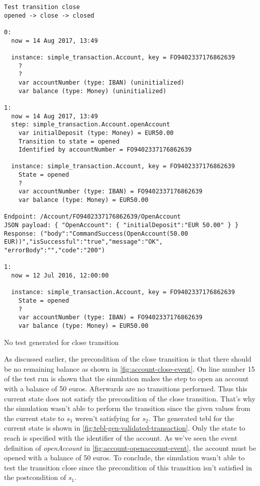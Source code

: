 \begin{sourcecode}[h!]
\begin{lstlisting}[]
Test transition close
opened -> close -> closed

0:
  now = 14 Aug 2017, 13:49

  instance: simple_transaction.Account, key = FO9402337176862639 
    ?
    ?
    var accountNumber (type: IBAN) (uninitialized) 
    var balance (type: Money) (uninitialized)   

1:
  now = 14 Aug 2017, 13:49
  step: simple_transaction.Account.openAccount 
    var initialDeposit (type: Money) = EUR50.00 
    Transition to state = opened 
    Identified by accountNumber = FO9402337176862639 

  instance: simple_transaction.Account, key = FO9402337176862639 
    State = opened
    ?
    var accountNumber (type: IBAN) = FO9402337176862639 
    var balance (type: Money) = EUR50.00   

Endpoint: /Account/FO9402337176862639/OpenAccount
JSON payload: { "OpenAccount": { "initialDeposit":"EUR 50.00" } }
Response: ("body":"CommandSuccess(OpenAccount(50.00 EUR))","isSuccessful":"true","message":"OK",
"errorBody":"","code":"200")

1:
  now = 12 Jul 2016, 12:00:00

  instance: simple_transaction.Account, key = FO9402337176862639 
    State = opened
    ?
    var accountNumber (type: IBAN) = FO9402337176862639 
    var balance (type: Money) = EUR50.00
\end{lstlisting}
\caption{No test generated for close transition}
\label{fig:result-codegenakka-close}
\end{sourcecode}

As discussed earlier, the precondition of the close transition is that there should be no remaining balance as shown in \autoref{fig:account-close-event}. On line number 15 of the test run is shown that the simulation makes the step to open an account with a balance of 50 euros. Afterwards are no transitions performed. Thus this current state does not satisfy the precondition of the close transition. That's why the simulation wasn't able to perform the transition since the given values from the current state to $s_{1}$ weren't satisfying for $s_{2}$. The generated tebl for the current state is shown in \autoref{fig:tebl-gen-validated-transaction}. Only the state to reach is specified with the identifier of the account. As we've seen the event definition of \textit{openAccount} in \autoref{fig:account-openaccount-event}, the account must be opened with a balance of 50 euros. 
To conclude, the simulation wasn't able to test the transition close since the precondition of this transition isn't satisfied in the postcondition of $s_{1}$.

